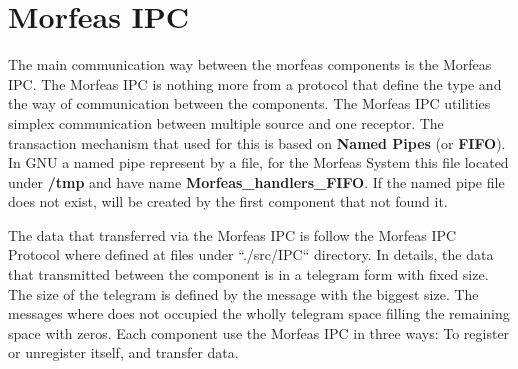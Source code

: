 \section{Morfeas IPC}
The main communication way between the morfeas components is the Morfeas IPC. The Morfeas IPC is nothing more from a protocol that define the type and
the way of communication between the components. The Morfeas IPC utilities simplex communication between multiple source and one receptor.
The transaction mechanism that used for this is based on \textbf{Named Pipes} (or \textbf{FIFO}). In GNU a named pipe represent by a file,
for the Morfeas System this file located under \textbf{/tmp} and have name \textbf{Morfeas\_handlers\_FIFO}.
If the named pipe file does not exist, will be created by the first component that not found it.

The data that transferred via the Morfeas IPC is follow the Morfeas IPC Protocol where defined at files under ``./src/IPC`` directory.
In details, the data that transmitted between the component is in a telegram form with fixed size.
The size of the telegram is defined by the message with the biggest size.
The messages where does not occupied the wholly telegram space filling the remaining space with zeros.
Each component use the Morfeas IPC in three ways: To register or unregister itself, and transfer data.
